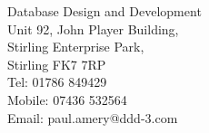 \documentclass[]{hieudo-build}
\begin{document}

Database Design and Development \\
\minisectionsep
Unit 92, John Player Building, \\
Stirling Enterprise Park, \\
Stirling FK7 7RP \\
\minisectionsep
Tel: 01786 849429 \\
Mobile: 07436 532564 \\
Email: paul.amery@ddd-3.com \\


\end{document}
